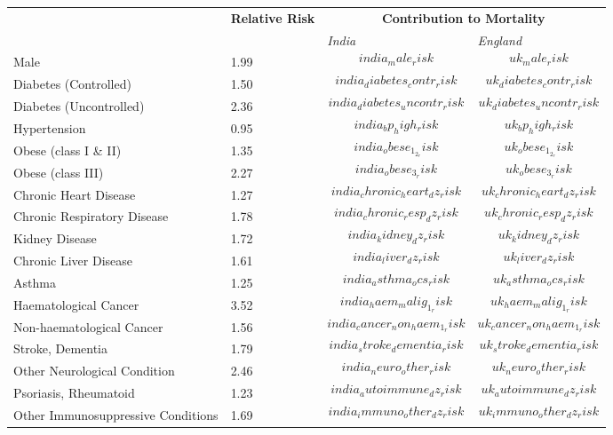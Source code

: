 \usepackage[a4paper,margin=1in,landscape]{geometry}
\usepackage{array}

\begin{tabular}{p{6cm}p{1.5cm}p{2cm}p{2cm}}
& \textbf{Relative \newline Risk} & \multicolumn{2}{c}{\textbf{Contribution to Mortality}} \\[-1.5ex]
& & \emph{India} & \emph{England} \\[2ex]
Male & 1.99 & $$india_male_risk$$ & $$uk_male_risk$$ \\[0.25ex]
Diabetes (Controlled) & 1.50 & $$india_diabetes_contr_risk$$ & $$uk_diabetes_contr_risk$$ \\[0.25ex]
Diabetes (Uncontrolled) & 2.36 & $$india_diabetes_uncontr_risk$$ & $$uk_diabetes_uncontr_risk$$ \\[0.25ex]
Hypertension & 0.95 & $$india_bp_high_risk$$ & $$uk_bp_high_risk$$ \\[0.25ex]
Obese (class I \& II) & 1.35 & $$india_obese_1_2_risk$$ & $$uk_obese_1_2_risk$$ \\[0.25ex]
Obese (class III) & 2.27 & $$india_obese_3_risk$$ & $$uk_obese_3_risk$$ \\[0.25ex]
Chronic Heart Disease & 1.27 & $$india_chronic_heart_dz_risk$$ & $$uk_chronic_heart_dz_risk$$ \\[0.25ex]
Chronic Respiratory Disease & 1.78 & $$india_chronic_resp_dz_risk$$ & $$uk_chronic_resp_dz_risk$$ \\[0.25ex]
Kidney Disease & 1.72 & $$india_kidney_dz_risk$$ & $$uk_kidney_dz_risk$$ \\[0.25ex]
Chronic Liver Disease & 1.61 & $$india_liver_dz_risk$$ & $$uk_liver_dz_risk$$ \\[0.25ex]
Asthma & 1.25 & $$india_asthma_ocs_risk$$ & $$uk_asthma_ocs_risk$$ \\[0.25ex]
Haematological Cancer & 3.52 & $$india_haem_malig_1_risk$$ & $$uk_haem_malig_1_risk$$ \\[0.25ex]
Non-haematological Cancer & 1.56 & $$india_cancer_non_haem_1_risk$$ & $$uk_cancer_non_haem_1_risk$$ \\[0.25ex]
Stroke, Dementia & 1.79 & $$india_stroke_dementia_risk$$ & $$uk_stroke_dementia_risk$$ \\[0.25ex]
Other Neurological Condition & 2.46 & $$india_neuro_other_risk$$ & $$uk_neuro_other_risk$$ \\[0.25ex]
Psoriasis, Rheumatoid & 1.23 & $$india_autoimmune_dz_risk$$ & $$uk_autoimmune_dz_risk$$ \\[0.25ex]
Other Immunosuppressive Conditions & 1.69 & $$india_immuno_other_dz_risk$$ & $$uk_immuno_other_dz_risk$$ \\[0.25ex]
\end{tabular}

